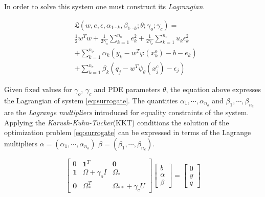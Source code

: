 In order to solve this system one must construct its
\emph{Lagrangian}.

\begin{align*}\label{eq:lag}
      & \mathfrak{L}(w,e,\epsilon, \alpha_{1 \cdots k}, \beta_{1 \cdots k}; \theta; \gamma_{o}; \gamma_{c}) = \\ 
      & \frac{1}{2} w^{T}w + \frac{1}{2\gamma_{o}} \sum_{k = 1}^{n_{o}}{e^{2}_{k}} +
      \frac{1}{2\gamma_{c}} \sum_{k = 1}^{n_{c}}{u_{k} \epsilon^{2}_{k}} \\
      & + \sum_{k = 1}^{n_{o}}{\alpha_{k}(y_{k} - w^{T}\varphi(x^{o}_{k}) - b - e_{k})} \\
      & + \sum_{k = 1}^{n_{c}}{\beta_{k} (q_{j} - w^{T}\psi_{\theta}(x^{c}_{j}) - \epsilon_{j})} 
\end{align*}

Given fixed values for $\gamma_{o}$, $\gamma_{c}$ and PDE parameters
$\theta$, the equation above expresses the Lagrangian of system
\ref{eq:surrogate}. The quantities $\alpha_{1}, \cdots, \alpha_{n_{o}}$ and
$\beta_{1}, \cdots, \beta_{n_{c}}$ are the \emph{Lagrange multipliers}
introduced for equality constraints of the system. Applying the
\emph{Karush-Kuhn-Tucker}(KKT) conditions the solution of the
optimization problem \ref{eq:surrogate} can be expressed in terms of
the Lagrange multipliers $\alpha = (\alpha_{1}, \cdots, \alpha_{n_{o}})$
$\beta = (\beta_{1}, \cdots, \beta_{n_{c}})$.

\begin{equation}\label{eq:solution}
  \begin{bmatrix}
    0 & \mathbf{1}^{T} & \mathbf{0} \\ 
    \mathbf{1} & \Omega + \gamma_{o}I  & \Omega_*\\ 
    \mathbf{0} & \Omega_{*}^{T}  & \Omega_{**} + \gamma_{c}U 
  \end{bmatrix} \begin{bmatrix}
    b\\ 
    \alpha\\ 
    \beta
  \end{bmatrix} = \begin{bmatrix}
    0\\ 
    y\\ 
    q
  \end{bmatrix}
\end{equation}


